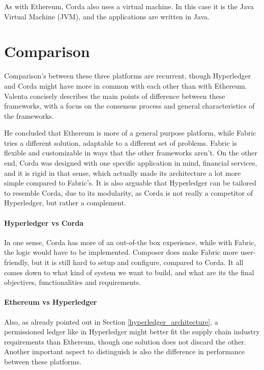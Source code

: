 As with Ethereum, Corda also uses a virtual machine. In this case it is the Java Virtual Machine (JVM), and the applications are written in Java.


\section{Comparison}
Comparison's between these three platforms are recurrent, though Hyperledger and Corda might have more in common with each other than with Ethereum. 
Valenta \cite{Valenta2017} concisely describes the main points of difference between these frameworks, with a focus on the consensus process and general characteristics of the frameworks. 

He concluded that Ethereum is more of a general purpose platform, while Fabric tries a different solution, adaptable to a different set of problems. Fabric is flexible and customizable in ways that the other frameworks aren't. On the other end, Corda  was designed with one specific application in mind, financial services, and it is rigid in that sense, which actually made its architecture a lot more simple compared to Fabric's. It is also arguable that Hyperledger can be tailored to resemble Corda, due to its modularity, as Corda is not really a competitor of Hyperledger, but rather a complement. 

\paragraph{Hyperledger vs Corda} In one sense, Corda has more of an out-of-the box experience, while with Fabric, the logic would have to be implemented. Composer does make Fabric more user-friendly, but it is still hard to setup and configure, compared to Corda. It all comes down to what kind of system we want to build, and what are its the final objectives, functionalities and requirements.

\paragraph{Ethereum vs Hyperledger} Also, as already pointed out in Section \ref{hyperledger_architecture}, a permissioned ledger like in Hyperledger might better fit the supply chain industry requirements than Ethereum, though one solution does not discard the other. Another important aspect to distinguish is also the difference in performance between these platforms.



